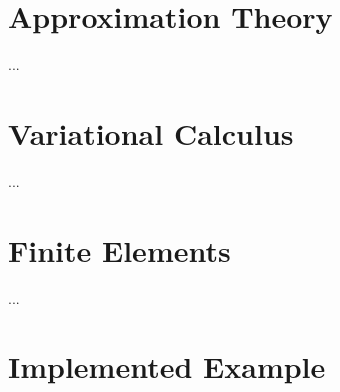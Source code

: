 \section{Approximation Theory}
...

\section{Variational Calculus}
...

\section{Finite Elements}
...

\section{Implemented Example}

